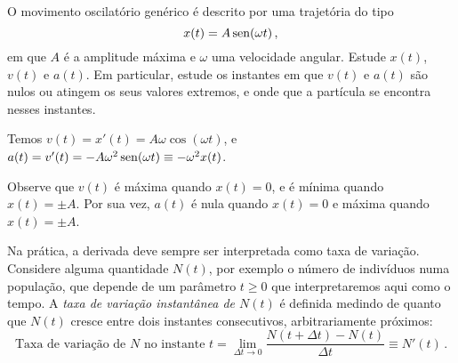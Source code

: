 \begin{exo}
O movimento oscilatório 
genérico é descrito por uma trajetória do tipo
$$x(t)=A\operatorname{sen} (\omega t)\,,$$ em que $A$ é a amplitude máxima e $\omega$ uma
velocidade angular.
Estude $x(t)$, $v(t)$ e $a(t)$. Em particular, estude os instantes em que
$v(t)$ e $a(t)$ são nulos ou atingem os seus valores extremos, e onde que a
partícula se encontra nesses instantes.
\begin{sol}
Temos $v(t)=x'(t)=A\omega \cos(\omega t)$, e $a(t)=v'(t)=-A\omega^2\operatorname{sen} (\omega
t)\equiv -\omega^2 x(t)$. 
\begin{center}
\begin{bmlimage}\end{bmlimage}
\end{center}
Observe que $v(t)$ é máxima quando $x(t)=0$, e é mínima quando $x(t)=\pm A$.
Por sua vez, $a(t)$ é nula quando $x(t)=0$ e máxima quando $x(t)=\pm A$.
\end{sol}
\end{exo}

Na prática, a derivada deve sempre ser interpretada como
taxa de variação.
Considere alguma quantidade $N(t)$, 
por exemplo o número de indivíduos numa população, que depende
de um parâmetro $t\geq 0$ que interpretaremos aqui como o
tempo.
A \emph{taxa de variação instantânea de $N(t)$} é
definida medindo de quanto que $N(t)$ cresce entre dois instantes
consecutivos, arbitrariamente próximos: 
$$\text{Taxa de variação de $N$ no 
instante }t=\lim_{\Delta t\to 0}\frac{N(t+\Delta
t)-N(t)}{\Delta t}\equiv N'(t)\,.
$$

